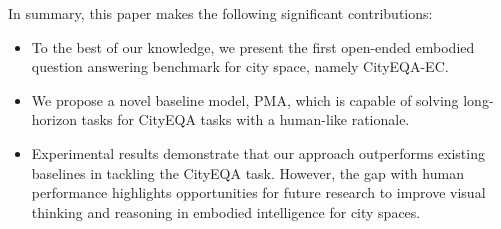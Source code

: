 
In summary, this paper makes the following significant contributions:
\vspace{-8pt}
\begin{itemize}[leftmargin=*]
    \item To the best of our knowledge, we present the first open-ended embodied question answering benchmark for city space, namely CityEQA-EC.
    \vspace{-7pt}
    \item We propose a novel baseline model, PMA, which is capable of solving long-horizon tasks for CityEQA tasks with a human-like rationale.
     \vspace{-7pt}
    \item Experimental results demonstrate that our approach outperforms existing baselines in tackling the CityEQA task. However, the gap with human performance highlights opportunities for future research to improve visual thinking and reasoning in embodied intelligence for city spaces.
\end{itemize}



